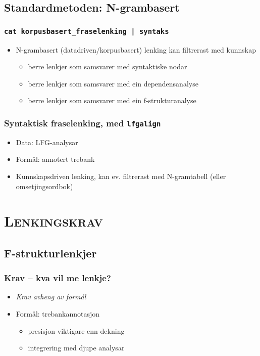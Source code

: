 \documentclass[xcolor=x11names,compress,bigger]{beamer}
\renewcommand{\(}{\begin{columns}}
\renewcommand{\)}{\end{columns}}
\newcommand{\<}[1]{\begin{column}{#1}}
\renewcommand{\>}{\end{column}}
\begin{document}
\subsection{Standardmetoden: N-grambasert}
\begin{frame}\frametitle{\texttt{cat korpusbasert\_fraselenking | syntaks}}
    \begin{itemize}
    \item N-grambasert (datadriven/korpusbasert) lenking kan filtrerast med kunnskap
      \begin{itemize}
       \item berre lenkjer som samsvarer med syntaktiske nodar \citep{samuelsson2007apa}
       \item berre lenkjer som samsvarer med ein dependensanalyse \citep{hearne2008ccd}
       \item berre lenkjer som samsvarer med ein f-strukturanalyse \citep{graham2009osr}
      \end{itemize}
    \end{itemize}
  \end{frame}

\begin{frame}\frametitle{Syntaktisk fraselenking, med \texttt{lfgalign}}
  \begin{itemize}
  \item Data: LFG-analysar
  \item Formål: annotert trebank
  \item Kunnskapsdriven lenking, kan ev. filtrerast med N-gramtabell (eller omsetjingsordbok)
  \end{itemize}
\end{frame}

\section{\scshape Lenkingskrav}
\subsection{F-strukturlenkjer}
\begin{frame}\frametitle{Krav -- kva vil me lenkje?}
  \begin{itemize}
  \item \emph{Krav avheng av formål}
  \item Formål: trebankannotasjon
    \begin{itemize}
    \item presisjon viktigare enn dekning
    \item integrering med djupe analysar
    \end{itemize}
  \end{itemize}
\end{frame}
\end{document}
